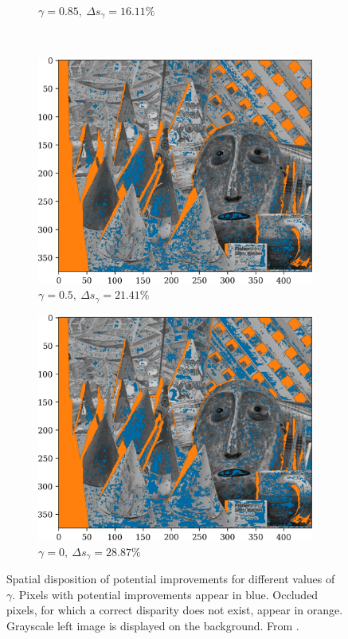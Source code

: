 \begin{figure}[ht]
\begin{subfigure}{0.48\linewidth}
        \caption{$\gamma=0.85,~\Delta s_\gamma=16.11\%$}
        \label{fig:improvements_b}
    \end{subfigure}\\
    \begin{subfigure}{0.48\linewidth}
        \centering
        \includegraphics[width=\linewidth]{Images/Chap_4/Improvements_Pl=0.5.png}
        \caption{$\gamma=0.5,~\Delta s_\gamma=21.41\%$}
        \label{fig:improvements_c}
    \end{subfigure}
    \begin{subfigure}{0.48\linewidth}
        \centering
        \includegraphics[width=\linewidth]{Images/Chap_4/Improvements_Pl=0.0.png}
        \caption{$\gamma=0,~\Delta s_\gamma=28.87\%$}
        \label{fig:improvements_d}
    \end{subfigure}
    \caption{Spatial disposition of potential improvements for different values of $\gamma$. Pixels with potential improvements appear in blue. Occluded pixels, for which a correct disparity does not exist, appear in orange. Grayscale left image is displayed on the background. From \cite{malinowski_uncertainty_2024}.}
    \label{fig:improvements}
\end{figure}


